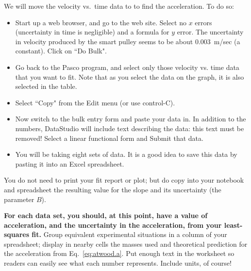We will move the velocity vs.\ time data to \WAPP to find the acceleration.  To do so:
\begin{itemize}
\item Start up a web browser, and go to the \WAPP web site.  Select
no $x$ errors (uncertainty in time is negligible) and a formula
for $y$ error. The uncertainty in velocity produced by the smart pulley
seems to be about 0.003~m/sec (a constant).  Click on ``Do Bulk".
%
\item Go back to the Pasco program, and select only those velocity vs.
time data that you want to fit.  Note that as you select the data on
the graph, it is also selected in the table. %
%
\item Select ``Copy" from the Edit menu (or use control-C).
%
\item Now switch to the \WAPP bulk entry form and paste your data in.
In addition to the numbers, DataStudio will include text describing the data:
this text must be removed!
Select a linear functional form and Submit that data.
%
\item You will be taking eight sets of data.  
It is a good idea to save this data by pasting it into an Excel spreadsheet.
%
%
\end{itemize}
%
You do not need to print your fit report or plot; but do 
copy into your notebook and spreadsheet the resulting value for
the slope and its uncertainty (the parameter $B$).

{\bf For each data set, you
should, at this point, have a value of acceleration, and the
uncertainty in the acceleration, from your least-squares fit.}
Group equivalent experimental situations in a column of
your spreadsheet; display in nearby cells the masses used and
theoretical prediction for the acceleration from Eq.~\ref{eq:atwood.a}.
Put enough text
in the worksheet so readers can easily see what each number
represents.  Include units, of course!



